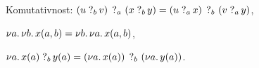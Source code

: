 \documentclass[a4paper,slovene]{article}
\begin{document}
\begin{axiom}{Komutativnost:}\label{ax-10}
    \( \measure{a}{\measureraw{b}{u}{v}}{\measureraw{b}{x}{y}}
        = \measure{b}{\measureraw{a}{u}{x}}{\measureraw{a}{v}{y}} \),
\end{axiom}

\begin{axiom}{}\label{ax-11}
    \( \new{a}{\new{b}{x{\p{a,b}}}} = \new{b}{\new{a}{x{\p{a,b}}}} \),
\end{axiom}

\begin{axiom}{}\label{ax-12}
    \( \new{a}{\measureraw{b}{x{\p a}}{y{\p a}}}
        = \measure{b}{\new{a}{x{\p a}}}{\new{a}{y{\p a}}} \).
\end{axiom}

\end{document}

